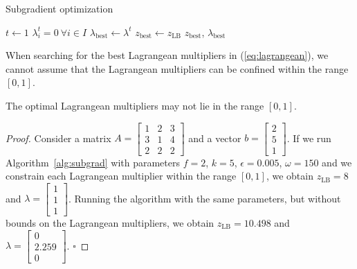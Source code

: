 \documentclass[runningheads]{llncs}
\begin{document}
\begin{algorithm}
  \DontPrintSemicolon
  \caption{Subgradient optimization}\label{alg:subgrad}
  $t \gets 1$\; 
  $\lambda_i^t = 0 ~ \forall i \in I$\;
  $\lambda_{\text{best}} \gets \lambda^t$\;
  $z_{\text{best}} \gets z_{\text{LB}}$\; 
  \Return $z_{\text{best}}$, $\lambda_{\text{best}}$
\end{algorithm}

When searching for the best Lagrangean multipliers in (\ref{eq:lagrangean}), we cannot assume that the Lagrangean multipliers can be confined within the range $[0, 1]$.

\begin{lemma}
  The optimal Lagrangean multipliers may not lie in the range $[0, 1]$.
\end{lemma}

\begin{proof}
  Consider a matrix $A = \begin{bmatrix}
    1 & 2 & 3\\
    3 & 1 & 4\\
    2 & 2 & 2
    \end{bmatrix}$ and a vector $b = \begin{bmatrix}2\\5\\1\end{bmatrix}$. If we run Algorithm~\ref{alg:subgrad} with parameters $f=2$, $k=5$, $\epsilon=0.005$, $\omega=150$ and we constrain each Lagrangean multiplier within the range $[0, 1]$, we obtain $z_{\text{LB}} = 8$ and $\lambda = \begin{bmatrix}1\\1\\1\end{bmatrix}$. Running the algorithm with the same parameters, but without bounds on the Lagrangean multipliers, we obtain $z_{\text{LB}} = 10.498$ and $\lambda = \begin{bmatrix}0\\2.259\\0\end{bmatrix}$. \hfill $\square$
\end{proof}
\end{document}
